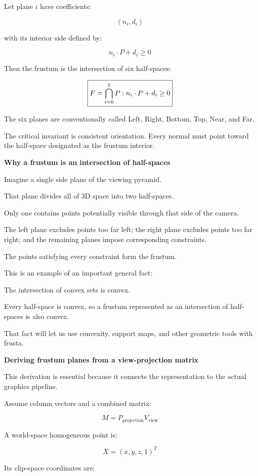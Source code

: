 Let plane \(i\) have coefficients:

\[
(n_i,d_i)
\]

with its interior side defined by:

\[
n_i\cdot P+d_i\ge0
\]

Then the frustum is the intersection of six half-spaces:

\[
\boxed{ F=\bigcap_{i=0}^{5} \\{P:n_i\cdot P+d_i\ge0\\} }
\]

The six planes are conventionally called Left, Right, Bottom, Top, Near, and Far.

The critical invariant is consistent orientation. Every normal must point toward the half-space designated as the frustum interior.

\textbf{Why a frustum is an intersection of half-spaces}

Imagine a single side plane of the viewing pyramid.

That plane divides all of 3D space into two half-spaces.

Only one contains points potentially visible through that side of the camera.

The left plane excludes points too far left; the right plane excludes points too far right; and the remaining planes impose corresponding constraints.

The points satisfying every constraint form the frustum.

This is an example of an important general fact:

The intersection of convex sets is convex.

Every half-space is convex, so a frustum represented as an intersection of half-spaces is also convex.

That fact will let us use convexity, support maps, and other geometric tools with frusta.

\textbf{Deriving frustum planes from a view-projection matrix}

This derivation is essential because it connects the representation to the actual graphics pipeline.

Assume column vectors and a combined matrix:

\[
M=P_{\mathrm{projection}}V_{\mathrm{view}}
\]

A world-space homogeneous point is:

\[
X=(x,y,z,1)^T
\]

Its clip-space coordinates are:

